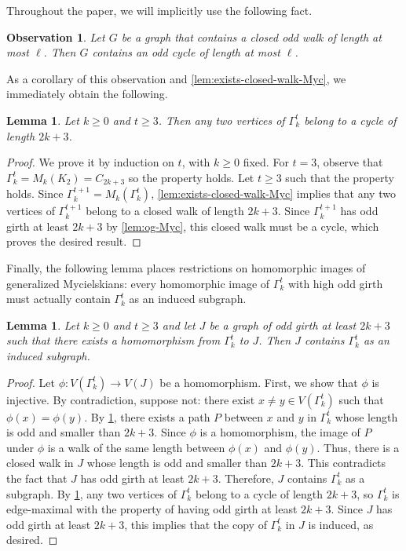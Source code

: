 \documentclass{article}
\newtheorem{lemma}[theorem]{Lemma}
\newtheorem{observation}[theorem]{Observation}
\begin{document}
Throughout the paper, we will implicitly use the following fact.

\begin{observation}\label{obs:odd-walk-cycle}
    Let $G$ be a graph that contains a closed odd walk of length at most $\ell$.
    Then $G$ contains an odd cycle of length at most $\ell$.
\end{observation}

As a corollary of this observation and \cref{lem:exists-closed-walk-Myc}, we immediately obtain the following.

\begin{lemma}\label{lem:Myc-2-vtces-odd-cycle}
    Let $k \geq 0$ and $t \geq 3$.
    Then any two vertices of $\Gamma_k^t$ belong to a cycle of length $2k+3$.
\end{lemma}

\begin{proof}
    We prove it by induction on $t$, with $k \geq 0$ fixed.
    For $t = 3$, observe that $\Gamma_k^t = M_k(K_2) = C_{2k+3}$ so the property holds.
    Let $t \geq 3$ such that the property holds.
    Since $\Gamma_k^{t+1} = M_k(\Gamma_k^t)$, \cref{lem:exists-closed-walk-Myc} implies that any two vertices of $\Gamma_k^{t+1}$ belong to a closed walk of length $2k+3$.
    Since $\Gamma_k^{t+1}$ has odd girth at least $2k+3$ by \cref{lem:og-Myc}, this closed walk must be a cycle, which proves the desired result.
\end{proof}

Finally, the following lemma places restrictions on homomorphic images of generalized Mycielskians: every homomorphic image of $\Gamma_k^t$ with high odd girth must actually contain $\Gamma_k^t$ as an induced subgraph.

\begin{lemma}\label{lem:Myc-core}
    Let $k \geq 0$ and $t \geq 3$ and let $J$ be a graph of odd girth at least $2k+3$ such that there exists a homomorphism from $\Gamma_k^t$ to $J$.
    Then $J$ contains $\Gamma_k^t$ as an induced subgraph.
\end{lemma}

\begin{proof}
    Let $\phi : V(\Gamma_k^t) \to V(J)$ be a homomorphism.
    First, we show that $\phi$ is injective.
    By contradiction, suppose not: there exist $x \neq y \in V(\Gamma_k^t)$ such that $\phi(x) = \phi(y)$.
    By \cref{lem:Myc-2-vtces-odd-cycle}, there exists a path $P$ between $x$ and $y$ in $\Gamma_k^t$ whose length is odd and smaller than $2k+3$.
    Since $\phi$ is a homomorphism, the image of $P$ under $\phi$ is a walk of the same length between $\phi(x)$ and $\phi(y)$.
    Thus, there is a closed walk in $J$ whose length is odd and smaller than $2k+3$.
    This contradicts the fact that $J$ has odd girth at least $2k+3$.
    Therefore, $J$ contains $\Gamma_k^t$ as a subgraph.
    By \cref{lem:Myc-2-vtces-odd-cycle}, any two vertices of $\Gamma_k^t$ belong to a cycle of length $2k+3$, so $\Gamma_k^t$ is edge-maximal with the property of having odd girth at least $2k+3$.
    Since $J$ has odd girth at least $2k+3$, this implies that the copy of $\Gamma_k^t$ in $J$ is induced, as desired.
\end{proof}
\end{document}
